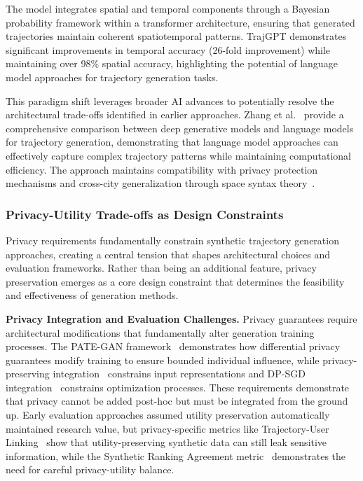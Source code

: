 The model integrates spatial and temporal components through a Bayesian probability framework within a transformer architecture, ensuring that generated trajectories maintain coherent spatiotemporal patterns. TrajGPT demonstrates significant improvements in temporal accuracy (26-fold improvement) while maintaining over 98\% spatial accuracy, highlighting the potential of language model approaches for trajectory generation tasks.

This paradigm shift leverages broader AI advances to potentially resolve the architectural trade-offs identified in earlier approaches. Zhang et al.~\cite{zhangEndtoendTrajectoryGeneration2025} provide a comprehensive comparison between deep generative models and language models for trajectory generation, demonstrating that language model approaches can effectively capture complex trajectory patterns while maintaining computational efficiency. The approach maintains compatibility with privacy protection mechanisms and cross-city generalization through space syntax theory~\cite{wangGTGGeneralizableTrajectory2025}.

\subsubsection{Privacy-Utility Trade-offs as Design Constraints}

Privacy requirements fundamentally constrain synthetic trajectory generation approaches, creating a central tension that shapes architectural choices and evaluation frameworks. Rather than being an additional feature, privacy preservation emerges as a core design constraint that determines the feasibility and effectiveness of generation methods.

\textbf{Privacy Integration and Evaluation Challenges.} Privacy guarantees require architectural modifications that fundamentally alter generation training processes. The PATE-GAN framework~\cite{jordonPATEGANGeneratingSynthetic2019} demonstrates how differential privacy guarantees modify training to ensure bounded individual influence, while privacy-preserving integration~\cite{raoCATSConditionalAdversarial2023} constrains input representations and DP-SGD integration~\cite{merhiSyntheticTrajectoryGeneration2024} constrains optimization processes. These requirements demonstrate that privacy cannot be added post-hoc but must be integrated from the ground up. Early evaluation approaches assumed utility preservation automatically maintained research value, but privacy-specific metrics like Trajectory-User Linking~\cite{raoCATSConditionalAdversarial2023} show that utility-preserving synthetic data can still leak sensitive information, while the Synthetic Ranking Agreement metric~\cite{jordonPATEGANGeneratingSynthetic2019} demonstrates the need for careful privacy-utility balance.

